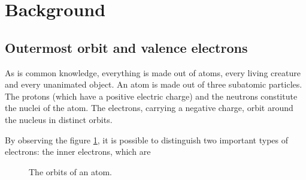 \section{Background}

\subsection{Outermost orbit and valence electrons}
As is common knowledge, everything is made out of atoms, every living creature and every unanimated object. An atom is made out of three subatomic particles. The protons (which have a positive electric charge) and the neutrons constitute the nuclei of the atom. The electrons, carrying a negative charge, orbit around the nucleus in distinct orbits.

By observing the figure \ref{fig:atom-structure}, it is possible to distinguish two important types of electrons: the inner electrons, which are


\begin{figure}[h]
    \centering
    
    \caption{The orbits of an atom.}
    \label{fig:atom-structure}
\end{figure}


